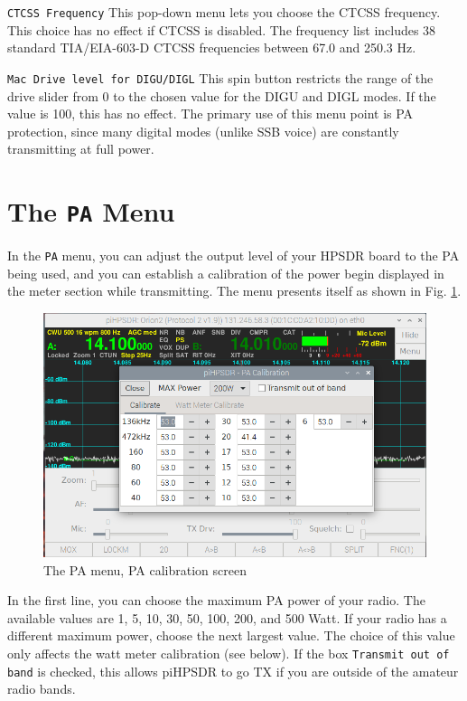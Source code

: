 \documentclass[12pt]{book}
\def\rett#1{\texttt{\color{red}#1}}
\def\bltt#1{\texttt{\color{blue}#1}}
\begin{document}
\rett{CTCSS Frequency} This pop-down menu lets you choose the CTCSS frequency. This choice has no effect if 
CTCSS is disabled.
The frequency list includes 38 standard TIA/EIA-603-D CTCSS frequencies between 67.0 and 250.3 Hz.

\rett{Mac Drive level for DIGU/DIGL} This spin button restricts the range of the drive slider from 0 to the 
chosen value
for the DIGU and DIGL modes. If the value is 100, this has no effect. The primary use of this menu point is 
PA protection,
since many digital modes (unlike SSB voice) are constantly transmitting at full power.

\section{The \texttt{PA} Menu}

In the \bltt{PA} menu, you can adjust the output level of your HPSDR board
to the PA being used, and you can establish a calibration of the 
power begin displayed in the meter section while transmitting.
The menu presents itself as shown in Fig. \ref{fig:PAMenuCalibrate}.

\begin{figure}[ht]
\center
\includegraphics[width=12cm]{PAMenuCalibrate.png}
\caption{The PA menu, PA calibration screen}
\label{fig:PAMenuCalibrate}
\end{figure}

In the first line, you can choose the maximum PA power of your
radio. The available values are 1, 5, 10, 30, 50, 100, 200, and
500 Watt. If your radio has a different maximum power, choose the
next largest value. The choice of this value only affects the
watt meter calibration (see below). If the  box
\rett{Transmit out of band} is checked, this allows piHPSDR
to go TX if you are outside of the amateur radio bands.
\end{document}
